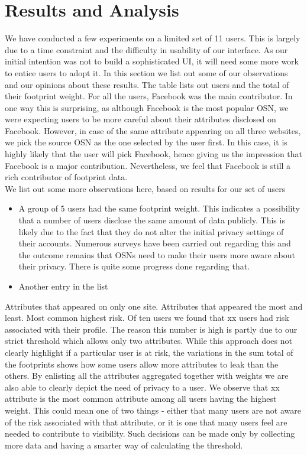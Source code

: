 \documentclass[10pt,conference]{IEEEtran}
\begin{document}
\section{Results and Analysis}
We have conducted a few experiments on a limited set of 11 users. This is largely due to a time constraint and the difficulty in usability of our interface. As our initial intention was not to build a sophisticated UI, it will need some more work to entice users to adopt it. In this section we list out some of our observations and our opinions about these results. The table lists out users and the total of their footprint weight. For all the users, Facebook was the main contributor. In one way this is surprising, as although Facebook is the most popular OSN, we were expecting users to be more careful about their attributes disclosed on Facebook. However, in case of the same attribute appearing on all three websites, we pick the source OSN as the one selected by the user first. In this case, it is highly likely that the user will pick Facebook, hence giving us the impression that Facebook is a major contribution. Nevertheless, we feel that Facebook is still a rich contributor of footprint data. \\
We list out some more observations here, based on results for our set of users
\begin{itemize}
\item A group of 5 users had the same footprint weight. This indicates a possibility that a number of users disclose the same amount of data publicly. This is likely due to the fact that they do not alter the initial privacy settings of their accounts. Numerous surveys have been carried out regarding this and the outcome remains that OSNs need to make their users more aware about their privacy. There is quite some progress done regarding that.
\item Another entry in the list
\end{itemize}
Attributes that appeared on only one site.
Attributes that appeared the most and least.
Most common highest risk.
Of ten users we found that xx users had risk associated with their profile. The reason this number is high is partly due to our strict threshold which allows only two attributes. While this approach does not clearly highlight if a particular user is at risk, the variations in the sum total of the footprints shows how some users allow more attributes to leak than the others. By enlisting all the attributes aggregated together with weights we are also able to clearly depict the need of privacy to a user. We observe that xx attribute is the most common attribute among all users having the highest weight. This could mean one of two things - either that many users are not aware of the risk associated with that attribute, or it is one that many users feel are needed to contribute to visibility. Such decisions can be made only by collecting more data and having a smarter way of calculating the threshold.  
\end{document}
